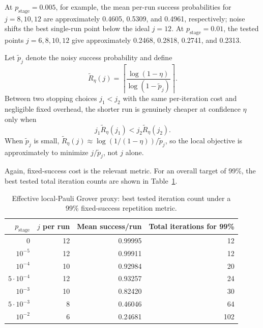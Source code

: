 \documentclass[10pt,a4paper]{article}
\begin{document}
At $p_{\mathrm{stage}}=0.005$, for example, the mean per-run success probabilities for $j=8,10,12$ are approximately 0.4605, 0.5309, and 0.4961, respectively; noise shifts the best single-run point below the ideal $j=12$. At $p_{\mathrm{stage}}=0.01$, the tested points $j=6,8,10,12$ give approximately 0.2468, 0.2818, 0.2741, and 0.2313.

Let $\widetilde p_j$ denote the noisy success probability and define
\begin{equation}
    \widetilde R_{\eta}(j)=
    \left\lceil
    \frac{\log(1-\eta)}{\log(1-\widetilde p_j)}
    \right\rceil .
\end{equation}
Between two stopping choices $j_1<j_2$ with the same per-iteration cost and negligible fixed overhead, the shorter run is genuinely cheaper at confidence $\eta$ only when
\begin{equation}
    j_1\widetilde R_{\eta}(j_1)
    <
    j_2\widetilde R_{\eta}(j_2).
    \label{eq:noisy_stopping_criterion}
\end{equation}
When $\widetilde p_j$ is small, $\widetilde R_{\eta}(j)\approx\log(1/(1-\eta))/\widetilde p_j$, so the local objective is approximately to minimize $j/\widetilde p_j$, not $j$ alone.

Again, fixed-success cost is the relevant metric. For an overall target of 99\%, the best tested total iteration counts are shown in Table~\ref{tab:noisy_fixed}.

\begin{table}[t]
\centering
\caption{Effective local-Pauli Grover proxy: best tested iteration count under a 99\% fixed-success repetition metric.}
\label{tab:noisy_fixed}
\begin{tabular}{rrrr}
\toprule
$p_{\mathrm{stage}}$ & $j$ per run & Mean success/run & Total iterations for 99\%\\
\midrule
0 & 12 & 0.99995 & 12\\
$10^{-5}$ & 12 & 0.99911 & 12\\
$10^{-4}$ & 10 & 0.92984 & 20\\
$5\cdot10^{-4}$ & 12 & 0.93257 & 24\\
$10^{-3}$ & 10 & 0.82420 & 30\\
$5\cdot10^{-3}$ & 8 & 0.46046 & 64\\
$10^{-2}$ & 6 & 0.24681 & 102\\
\bottomrule
\end{tabular}
\end{table}
\end{document}
